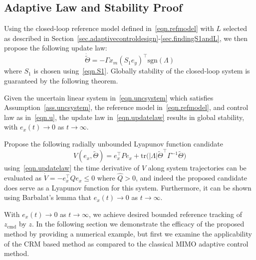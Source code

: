 \documentclass[]{../sty/aiaa-tc}
\begin{document}
  \subsection{Adaptive Law and Stability Proof}\label{sec.adaptivelaw}

  Using the closed-loop reference model defined in\ \eqref{eqn.refmodel} with $L$ selected as described in Section~\ref{sec.adaptivecontroldesign}-\ref{sec.findingS1andL}, we then propose the following update law:
  \begin{equation}
    \label{eqn.updatelaw}
    \dot{\widetilde{\Theta}}=-\Gamma x_{m}(S_{1}e_{y})^{\top}\text{sgn}(\Lambda)
  \end{equation}
  where $S_{1}$ is chosen using\ \eqref{eqn.S1}.
  Globally stability of the closed-loop system is guaranteed by the following theorem.

  \begin{thm-dan}
    Given the uncertain linear system in\ \eqref{eqn.uncsystem} which satisfies Assumption~\ref{ass.uncsystem}, the reference model in\ \eqref{eqn.refmodel}, and control law as in\ \eqref{eqn.u}, the update law in\ \eqref{eqn.updatelaw} results in global stability, with $e_{x}(t)\rightarrow0$ as $t\rightarrow\infty$.
  \end{thm-dan}

  \begin{proof-dan}
    Propose the following radially unbounded Lyapunov function candidate
    \begin{equation*}
      V(e_{x},\widetilde{\Theta})=e_{x}^{\top}Pe_{x}+\text{tr}\bigr(|\Lambda|\widetilde{\Theta}^{\top}\Gamma^{-1}\widetilde{\Theta}\bigr)
    \end{equation*}
    using\ \eqref{eqn.updatelaw} the time derivative of $V$ along system trajectories can be evaluated as $\dot{V}=-e_{x}^{\top}\widehat{Q}e_{x}\leq0$ where $\widehat{Q}>0$, and indeed the proposed candidate does serve as a Lyapunov function for this system.
    Furthermore, it can be shown using Barbalat's lemma that $e_{x}(t)\rightarrow0$ as $t\rightarrow\infty$.
  \end{proof-dan}

  With $e_{x}(t)\rightarrow0$ as $t\rightarrow\infty$, we achieve desired bounded reference tracking of $z_{\text{cmd}}$ by $z$.
  In the following section we demonstrate the efficacy of the proposed method by providing a numerical example, but first we examine the applicability of the CRM based method as compared to the classical MIMO adaptive control method.
\end{document}
